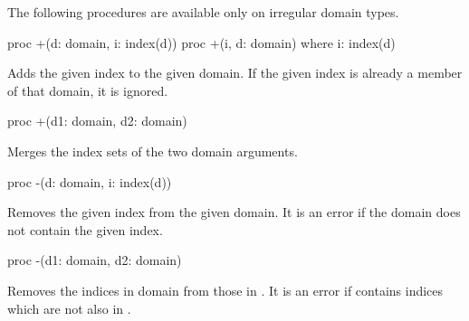 The following procedures are available only on irregular domain types.

\begin{protohead}
proc +(d: domain, i: index(d))
proc +(i, d: domain) where i: index(d)
\end{protohead}
\begin{protobody}
Adds the given index to the given domain.  If the given index is already a
member of that domain, it is ignored.
\end{protobody}

\begin{protohead}
proc +(d1: domain, d2: domain)
\end{protohead}
\begin{protobody}
Merges the index sets of the two domain arguments.
\end{protobody}

\begin{protohead}
proc -(d: domain, i: index(d))
\end{protohead}
\begin{protobody}
Removes the given index from the given domain.  It is an error if the domain
does not contain the given index.
\end{protobody}

\begin{protohead}
proc -(d1: domain, d2: domain)
\end{protohead}
\begin{protobody}
Removes the indices in domain  from those in .  It is an error
if  contains indices which are not also in .
\end{protobody}
